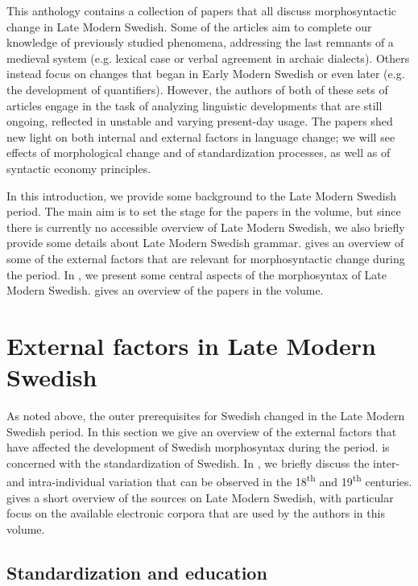 \documentclass[output=paper]{langscibook}
\begin{document}
This anthology contains a collection of papers that all discuss morphosyntactic change in Late Modern Swedish. Some of the articles aim to complete our knowledge of previously studied phenomena, addressing the last remnants of a medieval system (e.g. lexical case or verbal agreement in archaic dialects). Others instead focus on changes that began in Early Modern Swedish or even later (e.g. the development of quantifiers). However, the authors of both of these sets of articles engage in the task of analyzing linguistic developments that are still ongoing, reflected in unstable and varying present-day usage. The papers shed new light on both internal and external factors in language change; we will see effects of morphological change and of standardization processes, as well as of syntactic economy principles.



In this introduction, we provide some background to the Late Modern Swedish period. The main aim is to set the stage for the papers in the volume, but since there is currently no accessible overview of Late Modern Swedish, we also briefly provide some details about Late Modern Swedish grammar.  gives an overview of some of the external factors that are relevant for morphosyntactic change during the period. In , we present some central aspects of the morphosyntax of Late Modern Swedish.  gives an overview of the papers in the volume.


\section{External factors in Late Modern Swedish }\label{sec:intro:2}


As noted above, the outer prerequisites for Swedish changed in the Late Modern Swedish period. In this section we give an overview of the external factors that have affected the development of Swedish morphosyntax during the period.  is concerned with the standardization of Swedish. In , we briefly discuss the inter- and intra-individual variation that can be observed in the 18\textsuperscript{th} and 19\textsuperscript{th} centuries.  gives a short overview of the sources on Late Modern Swedish, with particular focus on the available electronic corpora that are used by the authors in this volume.


\subsection{Standardization and education}\label{sec:intro:2.1}
\end{document}
